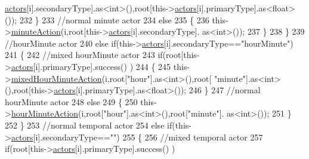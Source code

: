 \begin{DoxyCode}
      \hyperlink{class_jetpack_a7e16d2f97837f9712a2e6de1c50d99db}{actors}[i].secondaryType].as<int>(),root[this->\hyperlink{class_jetpack_a7e16d2f97837f9712a2e6de1c50d99db}{actors}[i].primaryType].as<float>());
232                         \}
233                         \textcolor{comment}{//normal minute actor}
234                         \textcolor{keywordflow}{else}
235                         \{
236                             this->\hyperlink{class_jetpack_a97da41141c7b53ddee61143519c8d17d}{minuteAction}(i,root[this->\hyperlink{class_jetpack_a7e16d2f97837f9712a2e6de1c50d99db}{actors}[i].secondaryType].
      as<int>());
237                         \}
238                     \}
239                     \textcolor{comment}{//hourMinute actor}
240                     \textcolor{keywordflow}{else} \textcolor{keywordflow}{if}(this->\hyperlink{class_jetpack_a7e16d2f97837f9712a2e6de1c50d99db}{actors}[i].secondaryType==\textcolor{stringliteral}{"hourMinute"})
241                     \{
242                         \textcolor{comment}{//mixed hourMinute actor}
243                         \textcolor{keywordflow}{if}(root[this->\hyperlink{class_jetpack_a7e16d2f97837f9712a2e6de1c50d99db}{actors}[i].primaryType].success() )
244                         \{
245                             this->\hyperlink{class_jetpack_a273dae1517b56f0242e28b8944edc26b}{mixedHourMinuteAction}(i,root[\textcolor{stringliteral}{"hour"}].as<int>(),root[\textcolor{stringliteral}{
      "minute"}].as<int>(),root[this->\hyperlink{class_jetpack_a7e16d2f97837f9712a2e6de1c50d99db}{actors}[i].primaryType].as<float>());
246                         \}
247                         \textcolor{comment}{//normal hourMinute actor}
248                         \textcolor{keywordflow}{else}
249                         \{
250                             this->\hyperlink{class_jetpack_ae01c13c785ebdf1b0bb5500234aba1bd}{hourMinuteAction}(i,root[\textcolor{stringliteral}{"hour"}].as<int>(),root[\textcolor{stringliteral}{"minute"}].
      as<int>());
251                         \}
252                     \}
253                     \textcolor{comment}{//normal temporal actor}
254                     \textcolor{keywordflow}{else} \textcolor{keywordflow}{if}(this->\hyperlink{class_jetpack_a7e16d2f97837f9712a2e6de1c50d99db}{actors}[i].secondaryType==\textcolor{stringliteral}{""})
255                     \{
256                         \textcolor{comment}{//mixed temporal actor}
257                         \textcolor{keywordflow}{if}(root[this->\hyperlink{class_jetpack_a7e16d2f97837f9712a2e6de1c50d99db}{actors}[i].primaryType].success() )

\end{DoxyCode}
